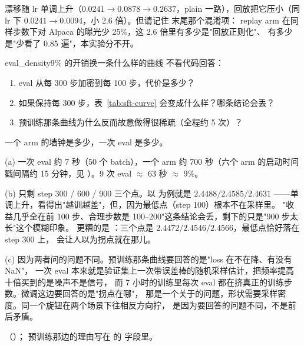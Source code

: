 漂移随 lr 单调上升（$0.0241 \to 0.0878 \to 0.2637$，plain 一路），回放把它压小（同 lr 下
$0.0241 \to 0.0094$，小 2.6 倍）。但请记住  末尾那个混淆项：
replay arm 在同样步数下对 Alpaca 的曝光少 25\%，这 2.6 倍里有多少是"回放正则化"、
有多少是"少看了 0.85 遍"，本实验分不开。

\begin{checkpoint}{eval_density}{9\% 的开销换一条什么样的曲线}
不看代码回答：
\begin{enumerate}[label=(\alph*)]
  \item eval 从每 300 步加密到每 100 步，代价是多少？
  \item 如果保持每 300 步，表~\ref{tab:sft-curve} 会变成什么样？哪条结论会丢？
  \item 预训练那条曲线为什么反而故意做得很稀疏（全程约 5 次）？
\end{enumerate}
\hint 一个 arm 的墙钟是多少，一次 eval 是多少。

\ifshowanswers
\tcblower
\answer (a) 一次 eval 约 7 秒（50 个 batch），一个 arm 约 700 秒（六个 arm 的启动时间戳间隔约
15 分钟，见 ）。9 次 eval $\approx$ 63 秒 $\approx$ 9\%。

(b) 只剩 step 300 / 600 / 900 三个点。以  为例就是 $2.4488 / 2.4585 / 2.4631$
——单调上升，看得出"越训越差"，但，因为最低点（step 100）根本不在采样里。
"收益几乎全在前 100 步、合理步数是 100--200"这条结论会丢，剩下的只是"900 步太长"这个模糊印象。
更糟的是 ：三个点是 $2.4472 / 2.4546 / 2.4566$，最低点恰好落在 step 300 上，
会让人以为拐点就在那儿。

(c) 因为两者问的问题不同。预训练那条曲线要回答的是"loss 在不在降、有没有 NaN"，
一次 eval 本来就是验证集上一次带误差棒的随机采样估计，把频率提高十倍买到的是噪声不是信号，
而 7 小时的训练里每次 eval 都在挤真正的训练步数。微调这边要回答的是"拐点在哪"，
那是一个关于的问题，形状需要采样密度。同一个旋钮在两个场景下往相反方向拧，
是因为要回答的问题不同，不是前后矛盾。

\whereincode {}（）；
预训练那边的理由写在  的  字段里。
\fi
\end{checkpoint}

